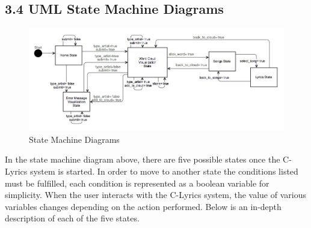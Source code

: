 \documentclass[]{article}
\begin{document}
\subsection{3.4 UML State Machine
Diagrams}\label{uml-state-machine-diagrams}

\begin{figure}[htbp]
\centering
\includegraphics{state_machine.jpg}
\caption{State Machine Diagrams}
\end{figure}

In the state machine diagram above, there are five possible states once
the C-Lyrics system is started. In order to move to another state the
conditions listed must be fulfilled, each condition is represented as a
boolean variable for simplicity. When the user interacts with the
C-Lyrics system, the value of various variables changes depending on the
action performed. Below is an in-depth description of each of the five
states.
\end{document}
